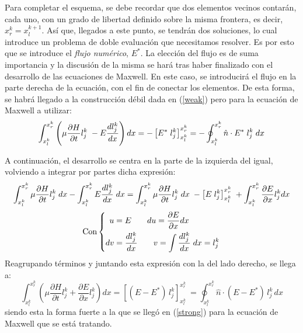 \documentclass[11pt,a4paper,twoside,pdf]{article}
\numberwithin{equation}{section}
\begin{document}
Para completar el esquema, se debe recordar que dos elementos vecinos contarán, cada uno, con un grado de libertad definido sobre la misma frontera, es decir, $x^k_r=x^{k+1}_l$. Así que, llegados a este punto, se tendrán dos soluciones, lo cual introduce un problema de doble evaluación que necesitamos resolver. Es por esto que se introduce el \textit{flujo numérico}, $E^*$. La elección del flujo es de suma importancia y la discusión de la misma se hará tras haber finalizado con el desarrollo de las ecuaciones de Maxwell. En este caso, se introducirá el flujo en la parte derecha de la ecuación, con el fin de conectar los elementos. De esta forma, se habrá llegado a la construcción débil dada en (\ref{weak}) pero para la ecuación de Maxwell a utilizar:
\begin{equation}
    \int^{x^k_r}_{x^k_l}\left(\mu\frac{\partial H}{\partial t}l_j^k\;-E\frac{dl_j^k}{dx}\right)dx=-\left[E^*\;l_j^k\right]^{x^k_r}_{x^k_l}=-\oint^{x^k_r}_{x^k_l}\hat{n}\cdot E^*\;l_j^k\;dx
    \notag    
\end{equation}

A continuación, el desarrollo se centra en la parte de la izquierda del igual, volviendo a integrar por partes dicha expresión:
\begin{equation}
\int^{x^k_r}_{x^k_l}\mu\frac{\partial H}{\partial t}l_j^k\;dx-\int^{x^k_r}_{x^k_l}E\frac{dl_j^k}{dx}\;dx=\int^{x^k_r}_{x^k_l}\mu\frac{\partial H}{\partial t}l_j^k\;dx \;-\left[E\;l_j^k\right]^{x^k_r}_{x^k_l}\; + \int^{x^k_r}_{x^k_l}\frac{\partial E}{\partial x}l_j^kdx
    \notag    
\end{equation}
\begin{equation}
        \text{Con}
\left\{
\begin{aligned}
u &= E \;\;\;\;\;\;\; du=\frac{\partial E}{\partial x}dx \\
dv &= \frac{d l_j^k}{dx}\;\;\;\;\;\;\; v=\int\frac{dl_j^k}{d x}\;dx=l_j^k
\end{aligned}
\right. \notag
\end{equation}
Reagrupando términos y juntando esta expresión con la del lado derecho, se llega a:
\begin{equation}
    \int_{x^k_l}^{x^k_r}\left(\mu\frac{\partial H}{\partial t}l_j^k + \frac{\partial E}{\partial x}l_j^k\right)dx 
= \left[(E - E^*)\, l_j^k\right]_{x^k_l}^{x^k_r} \
= \displaystyle \oint_{x^k_l}^{x^k_r} \hat{n} \cdot (E - E^*)\, l_j^k\, dx
\end{equation}
siendo esta la forma fuerte a la que se llegó en (\ref{strong}) para la ecuación de Maxwell que se está tratando.
\end{document}
